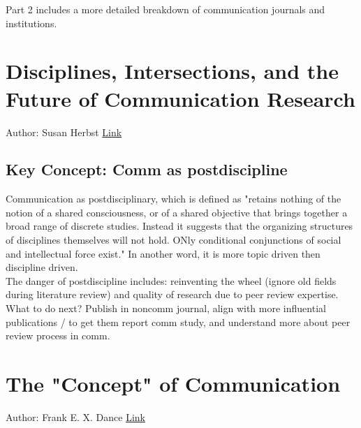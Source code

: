 Part 2 includes a more detailed breakdown of communication journals and institutions. 





\section{Disciplines, Intersections, and the Future of Communication Research}
Author: Susan Herbst 
\href{https://academic.oup.com/joc/article/58/4/603/4098348}{Link}

\subsection{Key Concept: Comm as postdiscipline}
Communication as postdisciplinary, which is defined as "retains nothing of the notion of a shared consciousness, or of a shared objective that brings together a broad range of discrete studies. Instead it suggests that the organizing structures of disciplines themselves will not hold. ONly conditional conjunctions of social and intellectual force exist." In another word, it is more topic driven then discipline driven. \\

The danger of postdiscipline includes: reinventing the wheel (ignore old fields during literature review) and quality of research due to peer review expertise. \\

What to do next? Publish in noncomm journal, align with more influential publications / to get them report comm study, and understand more about peer review process in comm. 





\section{The "Concept" of Communication} 
Author: Frank E. X. Dance 
\href{https://academic.oup.com/joc/article/58/4/603/4098348}{Link}
